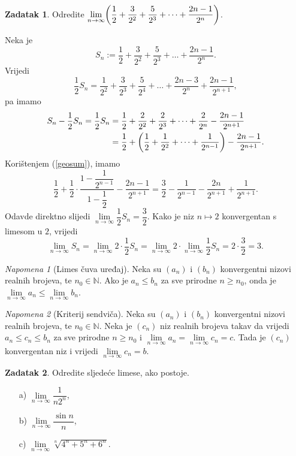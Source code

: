 \documentclass{book}
\let\originalleft\left
\let\originalright\right
\renewcommand{\left}{\mathopen{}\mathclose\bgroup\originalleft}
\renewcommand{\right}{\aftergroup\egroup\originalright}
\renewenvironment{proof}{%
    \vspace{-\parskip}\begin{oldproof}%
    }{%
    \end{oldproof}%
}
\theoremstyle{definition}
\theoremstyle{definition}
\newtheorem{exercise}{Zadatak}
\theoremstyle{remark}
\newtheorem{remark}{Napomena}
\begin{document}
\begin{exercise}
Odredite $\lim\limits_{n\to \infty}\left(\dfrac{1}{2}+\dfrac{3}{2^2}+\dfrac{5}{2^3}+\dots+\dfrac{2n-1}{2^n}\right)$.
\end{exercise}
\begin{proof}
Neka je
$$S_n:=\dfrac{1}{2}+\dfrac{3}{2^2}+\dfrac{5}{2^3}+\dots+\dfrac{2n-1}{2^n}.$$
Vrijedi
$$\dfrac{1}{2}S_n=\dfrac{1}{2^2}+\dfrac{3}{2^3}+\dfrac{5}{2^4}+\dots+\dfrac{2n-3}{2^{n}}+\dfrac{2n-1}{2^{n+1}},$$
pa imamo
\begin{align*}
S_n-\dfrac{1}{2}S_n=\dfrac{1}{2}S_n&=\dfrac{1}{2}+\dfrac{2}{2^2}+\dfrac{2}{2^3}+\dots+\dfrac{2}{2^n}-\dfrac{2n-1}{2^{n+1}}\\
&=\dfrac{1}{2}+\left(\dfrac{1}{2}+\dfrac{1}{2^2}+\dots+\dfrac{1}{2^{n-1}}\right)-\dfrac{2n-1}{2^{n+1}}.
\end{align*}
Korištenjem (\ref{geosum}), imamo
$$\dfrac{1}{2}+\dfrac{1}{2}\cdot\dfrac{1-\dfrac{1}{2^{n-1}}}{1-\dfrac{1}{2}}-\dfrac{2n-1}{2^{n+1}}=\dfrac{3}{2}-\dfrac{1}{2^{n-1}}-\dfrac{2n}{2^{n+1}}+\dfrac{1}{2^{n+1}}.$$
Odavde direktno slijedi $\lim\limits_{n\to \infty}{\dfrac{1}{2}S_n}=\dfrac{3}{2}$. Kako je niz $n\mapsto 2$ konvergentan s limesom u $2$, vrijedi
$$\lim\limits_{n\to \infty}{S_n}=\lim\limits_{n\to \infty}{2\cdot \dfrac{1}{2}S_n}=\lim\limits_{n\to \infty}{2}\cdot \lim\limits_{n\to \infty}{\dfrac{1}{2}S_n}=2\cdot \dfrac{3}{2}=3.$$
\end{proof}
\begin{remark}[Limes čuva uređaj]
\label{limitpreservesordering}
Neka su $(a_n)$ i $(b_n)$ konvergentni nizovi realnih brojeva, te $n_0\in \mathbb{N}$. Ako je $a_n\leq b_n$ za sve prirodne $n\geq n_0$, onda je $\lim\limits_{n\to \infty}{a_n}\leq \lim\limits_{n\to \infty}{b_n}$.
\end{remark}
\begin{remark}[Kriterij sendviča] 
Neka su $(a_n)$ i $(b_n)$ konvergentni nizovi realnih brojeva, te $n_0\in \mathbb{N}$. Neka je $(c_n)$ niz realnih brojeva takav da vrijedi $a_n\leq c_n\leq b_n$ za sve prirodne $n\geq n_0$ i $\lim\limits_{n\to \infty}{a_n}=\lim\limits_{n\to \infty}{c_n}=c$. Tada je $(c_n)$ konvergentan niz i vrijedi $\lim\limits_{n\to \infty}{c_n}=b$.
\end{remark}
\begin{exercise} Odredite sljedeće limese, ako postoje.
\begin{itemize}
\item[a)] $\lim\limits_{n\to \infty}{\dfrac{1}{n2^n}}$,
\item[b)] $\lim\limits_{n\to \infty}{\dfrac{\sin{n}}{n}}$,
\item[c)] $\lim\limits_{n\to \infty}{\sqrt[n]{4^n+5^n+6^n}}$.
\end{itemize}
\end{exercise}
\end{document}
